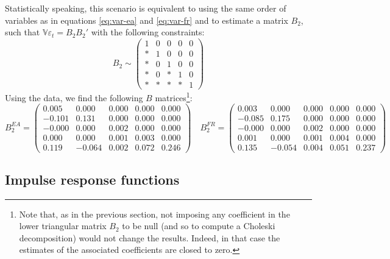 \documentclass[
  11pt,
]{article}
\begin{document}
Statistically speaking, this scenario is equivalent to using the same order of variables as in equations \eqref{eq:var-ea} and \eqref{eq:var-fr} and to estimate a matrix \(B_2\), such that \(\mathbb V\varepsilon_t=B_2B_2'\) with the following constraints:
\[ B_2\sim\begin{pmatrix}1 & 0 & 0 & 0 & 0\\
* & 1 & 0 & 0 & 0\\
* & 0 & 1 & 0 & 0\\
* & 0 & * & 1 & 0\\
* & * & * & * & 1
\end{pmatrix}\]
Using the data, we find the following \(B\) matrices\footnote{
  Note that, as in the previous section, not imposing any coefficient in the lower triangular matrix \(B_2\) to be null (and so to compute a Choleski decomposition) would not change the results. Indeed, in that case the estimates of the associated coefficients are closed to zero.}:
\[B_2^{EA} =\begin{pmatrix}
 0.005 & 0.000 & 0.000 & 0.000 & 0.000 \\
-0.101 & 0.131 & 0.000 & 0.000 & 0.000 \\
-0.000 & 0.000 & 0.002 & 0.000 & 0.000 \\
0.000 & 0.000 & 0.001 & 0.003 & 0.000 \\
0.119 & -0.064 & 0.002 & 0.072 & 0.246 
\end{pmatrix}
\quad
B_2^{FR}=\begin{pmatrix}
 0.003 & 0.000 & 0.000 & 0.000 & 0.000 \\
-0.085 & 0.175 & 0.000 & 0.000 & 0.000 \\
-0.000 & 0.000 & 0.002 & 0.000 & 0.000 \\
0.001 & 0.000 & 0.001 & 0.004 & 0.000 \\
0.135 & -0.054 & 0.004 & 0.051 & 0.237 
\end{pmatrix}\]

\hypertarget{impulse-response-functions}{%
\subsection{Impulse response functions}\label{impulse-response-functions}}
\end{document}
